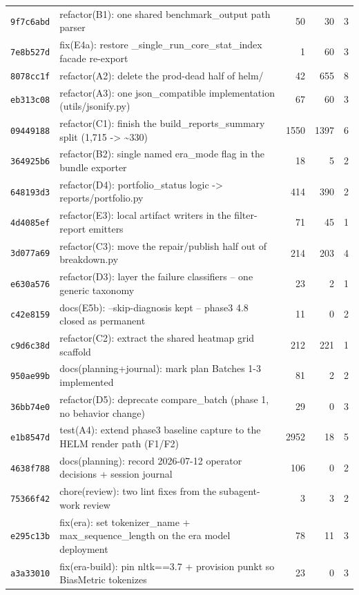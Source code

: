 \begin{longtable}{@{}p{}p{}r r r@{}}
\texttt{9f7c6abd} & refactor(B1): one shared benchmark\_output path parser & 50 & 30 & 3 \\
\texttt{7e8b527d} & fix(E4a): restore \_single\_run\_core\_stat\_index facade re-export & 1 & 60 & 3 \\
\texttt{8078cc1f} & refactor(A2): delete the prod-dead half of helm/ & 42 & 655 & 8 \\
\texttt{eb313c08} & refactor(A3): one json\_compatible implementation (utils/jsonify.py) & 67 & 60 & 3 \\
\texttt{09449188} & refactor(C1): finish the build\_reports\_summary split (1,715 -> \textasciitilde{}330) & 1550 & 1397 & 6 \\
\texttt{364925b6} & refactor(B2): single named era\_mode flag in the bundle exporter & 18 & 5 & 2 \\
\texttt{648193d3} & refactor(D4): portfolio\_status logic -> reports/portfolio.py & 414 & 390 & 2 \\
\texttt{4d4085ef} & refactor(E3): local artifact writers in the filter-report emitters & 71 & 45 & 1 \\
\texttt{3d077a69} & refactor(C3): move the repair/publish half out of breakdown.py & 214 & 203 & 4 \\
\texttt{e630a576} & refactor(D3): layer the failure classifiers -- one generic taxonomy & 23 & 2 & 1 \\
\texttt{c42e8159} & docs(E5b): --skip-diagnosis kept -- phase3 4.8 closed as permanent & 11 & 0 & 2 \\
\texttt{c9d6c38d} & refactor(C2): extract the shared heatmap grid scaffold & 212 & 221 & 1 \\
\texttt{950ae99b} & docs(planning+journal): mark plan Batches 1-3 implemented & 81 & 2 & 2 \\
\texttt{36bb74e0} & refactor(D5): deprecate compare\_batch (phase 1, no behavior change) & 29 & 0 & 3 \\
\texttt{e1b8547d} & test(A4): extend phase3 baseline capture to the HELM render path (F1/F2) & 2952 & 18 & 5 \\
\texttt{4638f788} & docs(planning): record 2026-07-12 operator decisions + session journal & 106 & 0 & 2 \\
\texttt{75366f42} & chore(review): two lint fixes from the subagent-work review & 3 & 3 & 2 \\
\texttt{e295c13b} & fix(era): set tokenizer\_name + max\_sequence\_length on the era model deployment & 78 & 11 & 3 \\
\texttt{a3a33010} & fix(era-build): pin nltk==3.7 + provision punkt so BiasMetric tokenizes & 23 & 0 & 3 \\

\end{longtable}

